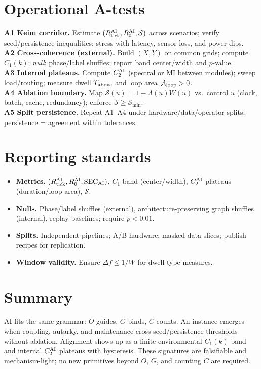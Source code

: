 \documentclass[12pt,a4paper,oneside]{scrreprt}
\begin{document}
\section{Operational A-tests}\label{sec:ai-tests}
\textbf{A1 Keim corridor.} Estimate $(R_{\rm tick}^{\rm AI}, R_0^{\rm AI}, \mathcal S)$ across scenarios; verify seed/persistence inequalities; stress with latency, sensor loss, and power dips.\\
\textbf{A2 Cross-coherence (external).} Build $(X,Y)$ on common grids; compute $C_1(k)$; \emph{null}: phase/label shuffles; report band center/width and $p$-value.\\
\textbf{A3 Internal plateaus.} Compute $C_2^{\rm AI}$ (spectral or MI between modules); sweep load/routing; measure dwell $T_{\rm above}$ and loop area $\mathcal A_{\rm loop}>0$.\\
\textbf{A4 Ablation boundary.} Map $\mathcal S(u)=1-\Lambda(u)W(u)$ vs.\ control $u$ (clock, batch, cache, redundancy); enforce $\mathcal S\ge\mathcal S_{\min}$.\\
\textbf{A5 Split persistence.} Repeat A1–A4 under hardware/data/operator splits; persistence = agreement within tolerances.

\section{Reporting standards}\label{sec:ai-standards}
\begin{itemize}
\item \textbf{Metrics.} $(R_{\rm tick}^{\rm AI}, R_0^{\rm AI}, \mathrm{SEC}_{\rm AI})$, $C_1$-band (center/width), $C_2^{\rm AI}$ plateaus (duration/loop area), $\mathcal S$.
\item \textbf{Nulls.} Phase/label shuffles (external), architecture-preserving graph shuffles (internal), replay baselines; require $p<0.01$.
\item \textbf{Splits.} Independent pipelines; A/B hardware; masked data slices; publish recipes for replication.
\item \textbf{Window validity.} Ensure $\Delta f\le 1/W$ for dwell-type measures.
\end{itemize}

\section*{Summary}
AI fits the same grammar: $O$ guides, $G$ binds, $C$ counts. 
An instance emerges when coupling, autarky, and maintenance cross seed/persistence thresholds without ablation. 
Alignment shows up as a finite environmental $C_1(k)$ band and internal $C_2^{\rm AI}$ plateaus with hysteresis. 
These signatures are falsifiable and mechanism-light; no new primitives beyond $O$, $G$, and counting $C$ are required.
\end{document}
